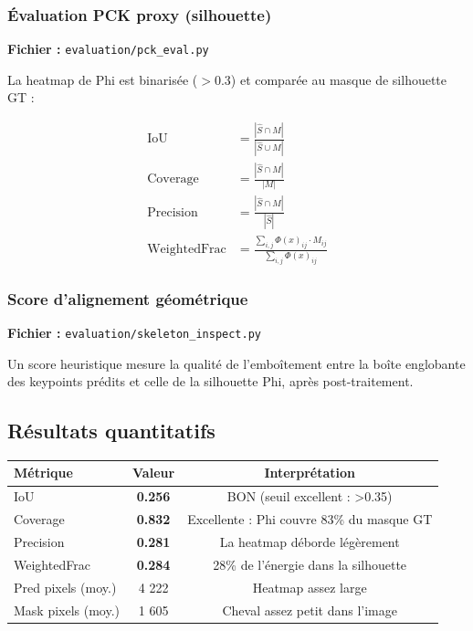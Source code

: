 \documentclass[12pt,a4paper]{article}
\begin{document}
\subsubsection*{Évaluation PCK proxy (silhouette)}

\textbf{Fichier :} \texttt{evaluation/pck\_eval.py}

La heatmap de Phi est binarisée ($> 0.3$) et comparée au masque de silhouette GT :

\begin{align}
  \text{IoU} &= \frac{|\hat{S} \cap M|}{|\hat{S} \cup M|} \\[4pt]
  \text{Coverage} &= \frac{|\hat{S} \cap M|}{|M|} \\[4pt]
  \text{Precision} &= \frac{|\hat{S} \cap M|}{|\hat{S}|} \\[4pt]
  \text{WeightedFrac} &= \frac{\sum_{i,j} \Phi(x)_{ij} \cdot M_{ij}}{\sum_{i,j} \Phi(x)_{ij}}
\end{align}

\subsubsection*{Score d'alignement géométrique}

\textbf{Fichier :} \texttt{evaluation/skeleton\_inspect.py}

Un score heuristique mesure la qualité de l'emboîtement entre la boîte englobante
des keypoints prédits et celle de la silhouette Phi, après post-traitement.

\subsection{Résultats quantitatifs}

\begin{resultbox}[Résultats PCK --- Run19, Époque 150, N=50 images]
\begin{center}
\begin{tabular}{lcc}
\toprule
\textbf{Métrique} & \textbf{Valeur} & \textbf{Interprétation} \\
\midrule
IoU             & \textbf{0.256} & BON (seuil excellent : >0.35) \\
Coverage        & \textbf{0.832} & Excellente : Phi couvre 83\% du masque GT \\
Precision       & \textbf{0.281} & La heatmap déborde légèrement \\
WeightedFrac    & \textbf{0.284} & 28\% de l'énergie dans la silhouette \\
Pred pixels (moy.) & 4 222 & Heatmap assez large \\
Mask pixels (moy.) & 1 605 & Cheval assez petit dans l'image \\
\bottomrule
\end{tabular}
\end{center}
\end{resultbox}
\end{document}
